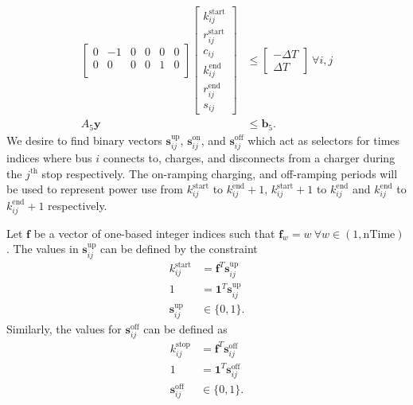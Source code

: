 \begin{equation} \begin{aligned}
	\begin{bmatrix} 0 & -1 & 0 & 0 & 0 & 0\\
		        0 &  0 & 0 & 0 & 1 & 0\\
	\end{bmatrix} 
	\begin{bmatrix} k_{ij}^{\text{start}} \\
		        r_{ij}^{\text{start}} \\
			c_{ij}                \\
			k_{ij}^{\text{end}}   \\
			r_{ij}^{\text{end}}   \\
			s_{ij}
	\end{bmatrix} &\le 
	\begin{bmatrix} -\Delta T \\
			\Delta T
	\end{bmatrix} \ \forall i,j \\ 
	A_5\mathbf{y} &\le \mathbf{b}_5.  
\end{aligned} \end{equation}
We desire to find binary vectors $\mathbf{s}^{\text{up}}_{ij}$, $\mathbf{s}^{\text{on}}_{ij}$, and $\mathbf{s}^{\text{off}}_{ij}$ which act as selectors for times indices where bus $i$ connects to, charges, and disconnects from a charger during the $j^{\text{th}}$ stop respectively. The on-ramping charging, and off-ramping periods will be used to represent power use from $k^{\text{start}}_{ij}$ to $k^{\text{end}}_{ij} + 1$, $k^{\text{start}}_{ij} + 1$ to $k^{\text{end}}_{ij}$ and $k^{\text{end}}_{ij}$ to $k^{\text{end}}_{ij} + 1$ respectively. 
\par Let $\mathbf{f}$ be a vector of one-based integer indices such that $\mathbf{f}_w = w \ \forall w \in (1,\text{nTime})$. The values in $\mathbf{s}^{\text{up}}_{ij}$ can be defined by the constraint
\begin{equation}\label{eqn:idxStart}\begin{aligned}
	k^{\text{start}}_{ij} &= \mathbf{f}^T\mathbf{s}^{\text{up}}_{ij} \\
	1 &= \mathbf{1}^T\mathbf{s}^{\text{up}}_{ij} \\
	\mathbf{s}^{\text{up}}_{ij} &\in \{0,1\}.
\end{aligned} \end{equation}
Similarly, the values for $\mathbf{s}^{\text{off}}_{ij}$ can be defined as
\begin{equation} \label{eqn:idxEnd}\begin{aligned}
	k^{\text{stop}}_{ij} &= \mathbf{f}^T\mathbf{s}^{\text{off}}_{ij}\\ 
	1 &= \mathbf{1}^T\mathbf{s}^{\text{off}}_{ij} \\
	\mathbf{s}^{\text{off}}_{ij} &\in \{0,1\}.
\end{aligned} \end{equation}

